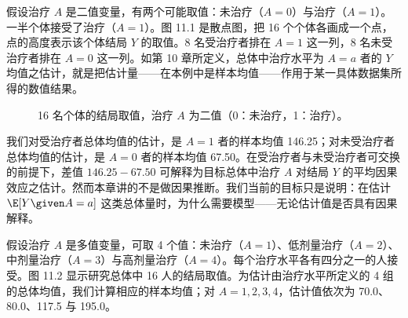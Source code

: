 假设治疗 $A$ 是二值变量，有两个可能取值：未治疗（$A=0$）与治疗（$A=1$）。一半个体接受了治疗（$A=1$）。图 11.1 是散点图，把 16 个个体各画成一个点，点的高度表示该个体结局 $Y$ 的取值。8 名受治疗者排在 $A=1$ 这一列，8 名未受治疗者排在 $A=0$ 这一列。如第 10 章所定义，总体中治疗水平为 $A=a$ 者的 $Y$ 均值之估计，就是把估计量——在本例中是样本均值——作用于某一具体数据集所得的数值结果。

\begin{figure}[htbp]
\centering
{}
\caption{16 名个体的结局取值，治疗 $A$ 为二值（0：未治疗，1：治疗）。}
\label{fig:11.1}
\end{figure}

我们对受治疗者总体均值的估计，是 $A=1$ 者的样本均值 146.25；对未受治疗者总体均值的估计，是 $A=0$ 者的样本均值 67.50。在受治疗者与未受治疗者可交换的前提下，差值 $146.25-67.50$ 可解释为目标总体中治疗 $A$ 对结局 $Y$ 的平均因果效应之估计。然而本章讲的不是做因果推断。我们当前的目标只是说明：在估计 $\E[Y\given A=a]$ 这类总体量时，为什么需要模型——无论估计值是否具有因果解释。

假设治疗 $A$ 是多值变量，可取 4 个值：未治疗（$A=1$）、低剂量治疗（$A=2$）、中剂量治疗（$A=3$）与高剂量治疗（$A=4$）。每个治疗水平各有四分之一的人接受。图 11.2 显示研究总体中 16 人的结局取值。为估计由治疗水平所定义的 4 组的总体均值，我们计算相应的样本均值；对 $A=1,2,3,4$，估计值依次为 70.0、80.0、117.5 与 195.0。

